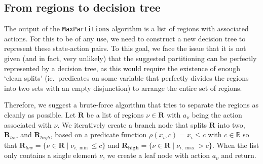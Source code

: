 \begin{algorithm}[ht]
\begin{algorithmic}[1]
                    \item
                        \EndIf%
                    \EndFor%

                \EndIf%

            \EndFor%
        \EndWhile%


        \EndFunction%
    \end{algorithmic}

\end{algorithm}

\subsection{From regions to decision tree}%
\label{sub:regionsToDT}

The output of the \texttt{MaxPartitions} algorithm is a list of regions with
associated actions. For this to be of any use, we need to construct a new
decision tree to represent these state-action pairs. To this goal, we face the
issue that it is not given (and in fact, very unlikely) that the suggested
partitioning can be perfectly represented by a decision tree, as this would
require the existence of enough `clean splits' (ie.\ predicates on some variable
that perfectly divides the regions into two sets with an empty disjunction) to
arrange the entire set of regions.

Therefore, we suggest a brute-force algorithm that tries to separate the regions
as cleanly as possible. Let $\mathbf{R}$ be a list of regions $\nu \in
\mathbf{R}$ with $a_{\nu}$ being the action associated with $\nu$. We
iteratively create a branch node that splits $\mathbf{R}$ into two,
$\mathbf{R}_{low}$ and $\mathbf{R}_{high}$, based on a predicate function
$\rho(x_i,c) = x_i \le c$ with $c \in \mathbb{R}$ so that $\mathbf{R}_{low} = \{
\nu \in \mathbf{R} \mid \nu_{i,\min} \le c \}$ and $\mathbf{R_{high}} = \{ \nu
\in \mathbf{R} \mid \nu_{i,\max} > c \}$. When the list only contains a single
element $\nu$, we create a leaf node with action $a_{\nu}$ and return.


